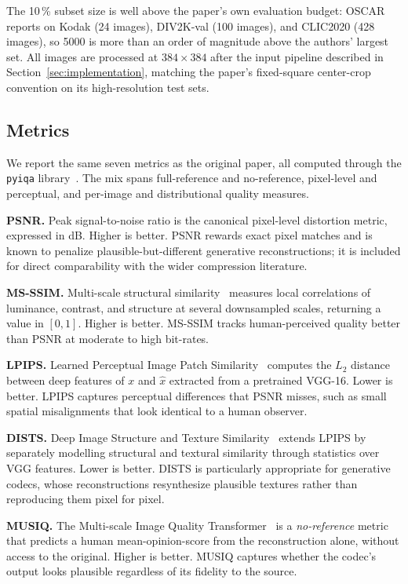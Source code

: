 \documentclass[conference]{IEEEtran}
\begin{document}
The 10\,\% subset size is well above the paper's own evaluation budget: OSCAR
reports on Kodak (24 images), DIV2K-val (100 images), and CLIC2020 (428
images), so 5000 is more than an order of magnitude above the authors'
largest set. All images are processed at $384 \times 384$ after the input
pipeline described in Section~\ref{sec:implementation}, matching the paper's
fixed-square center-crop convention on its high-resolution test sets.

\subsection{Metrics}

We report the same seven metrics as the original paper, all computed through
the \texttt{pyiqa} library~\cite{pyiqa}. The mix spans full-reference and
no-reference, pixel-level and perceptual, and per-image and distributional
quality measures.

\textbf{PSNR.} Peak signal-to-noise ratio is the canonical pixel-level
distortion metric, expressed in dB. Higher is better. PSNR rewards exact
pixel matches and is known to penalize plausible-but-different generative
reconstructions; it is included for direct comparability with the wider
compression literature.

\textbf{MS-SSIM.} Multi-scale structural similarity~\cite{msssim} measures
local correlations of luminance, contrast, and structure at several
downsampled scales, returning a value in $[0, 1]$. Higher is better.
MS-SSIM tracks human-perceived quality better than PSNR at moderate to high
bit-rates.

\textbf{LPIPS.} Learned Perceptual Image Patch Similarity~\cite{lpips}
computes the $L_2$ distance between deep features of $x$ and $\hat{x}$
extracted from a pretrained VGG-16. Lower is better. LPIPS captures
perceptual differences that PSNR misses, such as small spatial misalignments
that look identical to a human observer.

\textbf{DISTS.} Deep Image Structure and Texture Similarity~\cite{dists}
extends LPIPS by separately modelling structural and textural similarity
through statistics over VGG features. Lower is better. DISTS is particularly
appropriate for generative codecs, whose reconstructions resynthesize
plausible textures rather than reproducing them pixel for pixel.

\textbf{MUSIQ.} The Multi-scale Image Quality Transformer~\cite{musiq} is a
\emph{no-reference} metric that predicts a human mean-opinion-score from the
reconstruction alone, without access to the original. Higher is better.
MUSIQ captures whether the codec's output looks plausible regardless of its
fidelity to the source.
\end{document}

